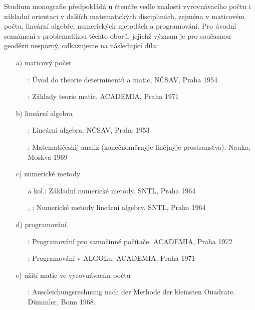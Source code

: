 Studium monografie předpokládá u čtenáře vedle znalosti
vyrovnávacího počtu i základní orientaci v dalších matematických
disciplinách, zejména v maticovém počtu, lineární algebře,
numerických metodách a programování. Pro úvodní seznámení
s problematikou těchto oborů, jejichž význam je pro současnou
geodézii nesporný, odkazujeme na následující díla:

\pagebreak[3]

\begin{itemize}

\item[a)] maticový počet
  \begin{itemize}
  \item[] : Úvod do theorie determinentů a matic,
          NČSAV, Praha 1954
  \item[] : Základy teorie matic. ACADEMIA, Praha 1971
  \end{itemize}

\item[b)] lineární algebra
  \begin{itemize}
  \item[] : Lineární algebra. NČSAV, Praha 1953
  \item[] : Matematičeskij analiz (konečnoměrnyje
    linějnyje prostranstva). Na\-u\-ka, Moskva 1969
  \end{itemize}

\item[c)] numerické metody
  \begin{itemize}
  \item[]  a kol.: Základní numerické metody. SNTL,
          Praha 1964
  \item[] , :
          Numerické metody lineární
          algebry. SNTL, Praha 1964
  \end{itemize}

\item[d)] programování
  \begin{itemize}
  \item[] : Programování pro samočinné počítače.
          ACADEMIA, Praha 1972
  \item[] : Programování v ALGOLu.
          ACADEMIA, Praha 1971
  \end{itemize}

\item[e)] užití matic ve vyrovnávacím počtu
  \begin{itemize}
  \item[] : Auscleichungsrechnung nach der Methode der
    kleinsten Ouadrate. Dümmler, Bonn 1968.

  \end{itemize}

\end{itemize}





